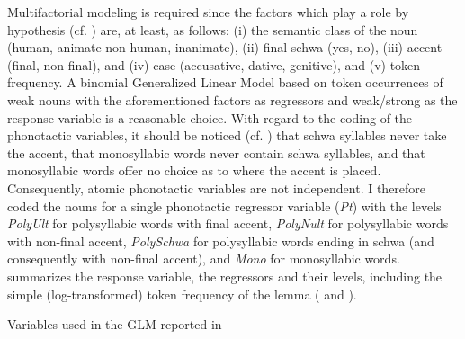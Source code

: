 \begin{styleMoutonText}
Multifactorial modeling is required since the factors which play a role by hypothesis (cf. ) are, at least, as follows: (i) the semantic class of the noun (human, animate non-human, inanimate), (ii) final schwa (yes, no), (iii) accent (final, non-final), and (iv) case (accusative, dative, genitive), and (v) token frequency. A binomial Generalized Linear Model based on token occurrences of weak nouns with the aforementioned factors as regressors and weak/strong as the response variable is a reasonable choice. With regard to the coding of the phonotactic variables, it should be noticed (cf. ) that schwa syllables never take the accent, that monosyllabic words never contain schwa syllables, and that monosyllabic words offer no choice as to where the accent is placed. Consequently, atomic phonotactic variables are not independent. I therefore coded the nouns for a single phonotactic regressor variable (\textit{Pt}) with the levels \textit{PolyUlt} for polysyllabic words with final accent, \textit{PolyNult} for polysyllabic words with non-final accent, \textit{PolySchwa} for polysyllabic words ending in schwa (and consequently with non-final accent), and \textit{Mono} for monosyllabic words.  summarizes the response variable, the regressors and their levels, including the simple (log-transformed) token frequency of the lemma ( and ).
\end{styleMoutonText}

\begin{styleMoutonCaption}%
\begin{table}
\caption{Variables used in the GLM reported in }
\label{tab:4}
\end{table}\end{styleMoutonCaption}

\tablefirsthead{}

